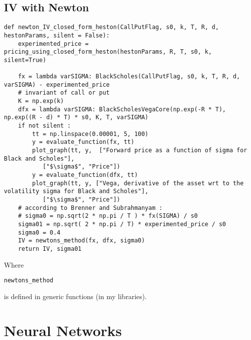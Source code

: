\subsection{ IV with Newton }
\label{appendix_code:newton}
\begin{Verbatim}[fontsize=\tiny]
def newton_IV_closed_form_heston(CallPutFlag, s0, k, T, R, d, hestonParams, silent = False):
    experimented_price = pricing_using_closed_form_heston(hestonParams, R, T, s0, k, silent=True)

    fx = lambda varSIGMA: BlackScholes(CallPutFlag, s0, k, T, R, d, varSIGMA) - experimented_price
    # invariant of call or put
    K = np.exp(k)
    dfx = lambda varSIGMA: BlackScholesVegaCore(np.exp(-R * T), np.exp((R - d) * T) * s0, K, T, varSIGMA)
    if not silent :
        tt = np.linspace(0.00001, 5, 100)
        y = evaluate_function(fx, tt)
        plot_graph(tt, y,  ["Forward price as a function of sigma for Black and Scholes"],
           ["$\sigma$", "Price"])
        y = evaluate_function(dfx, tt)
        plot_graph(tt, y, ["Vega, derivative of the asset wrt to the volatility sigma for Black and Scholes"],
           ["$\sigma$", "Price"])
    # according to Brenner and Subrahmanyam :
    # sigma0 = np.sqrt(2 * np.pi / T ) * fx(SIGMA) / s0
    sigma01 = np.sqrt( 2 * np.pi / T) * experimented_price / s0
    sigma0 = 0.4
    IV = newtons_method(fx, dfx, sigma0)
    return IV, sigma01
\end{Verbatim}

Where 
\begin{verbatim} 
newtons_method  
\end{verbatim} 
is defined in generic functions (in my libraries).

\section{Neural Networks}

